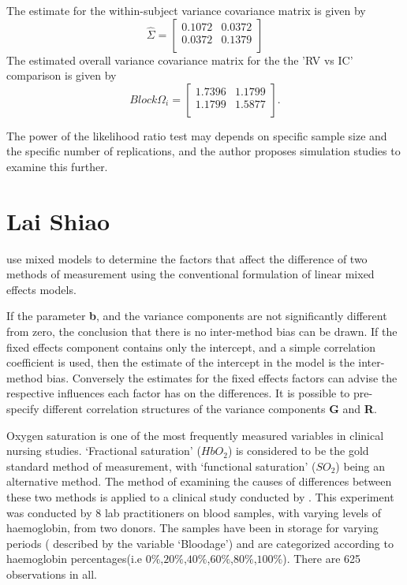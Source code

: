 \documentclass[12pt, a4paper]{report}
\theoremstyle{plain}
\theoremstyle{definition}
\theoremstyle{remark}
\begin{document}
The estimate for the within-subject variance covariance matrix is
given by
\begin{equation}
\hat{\Sigma}= \left[ \begin{array}{cc}
0.1072 & 0.0372  \\
0.0372 & 0.1379  \\
\end{array}\right]
\end{equation}
The estimated overall variance covariance matrix for the the 'RV
vs IC' comparison is given by
\begin{equation}
Block \Omega_{i}= \left[ \begin{array}{cc}
1.7396 & 1.1799  \\
1.1799 & 1.5877  \\
\end{array} \right].
\end{equation}

The power of the
likelihood ratio test may depends on specific sample size and the
specific number of  replications, and the author proposes
simulation studies to examine this further.



\section{Lai Shiao}
\citet{LaiShiao} use mixed models to determine the factors that
affect the difference of two methods of measurement using the
conventional formulation of linear mixed effects models.

If the parameter \textbf{b}, and the variance components are not
significantly different from zero, the conclusion that there is no
inter-method bias can be drawn. If the fixed effects component
contains only the intercept, and a simple correlation coefficient
is used, then the estimate of the intercept in the model is the
inter-method bias. Conversely the estimates for the fixed effects
factors can advise the respective influences each factor has on
the differences. It is possible to pre-specify different
correlation structures of the variance components \textbf{G} and
\textbf{R}.


Oxygen saturation is one of the most frequently measured variables
in clinical nursing studies. `Fractional saturation' ($HbO_{2}$)
is considered to be the gold standard method of measurement, with
`functional saturation' ($SO_{2}$) being an alternative method.
The method of examining the causes of differences between these
two methods is applied to a clinical study conducted by
\citet{Shiao}. This experiment was conducted by 8 lab
practitioners on blood samples, with varying levels of
haemoglobin, from two donors. The samples have been in storage for
varying periods ( described by the variable `Bloodage') and are
categorized according to haemoglobin percentages(i.e
$0\%$,$20\%$,$40\%$,$60\%$,$80\%$,$100\%$). There are 625
observations in all.
\end{document}
